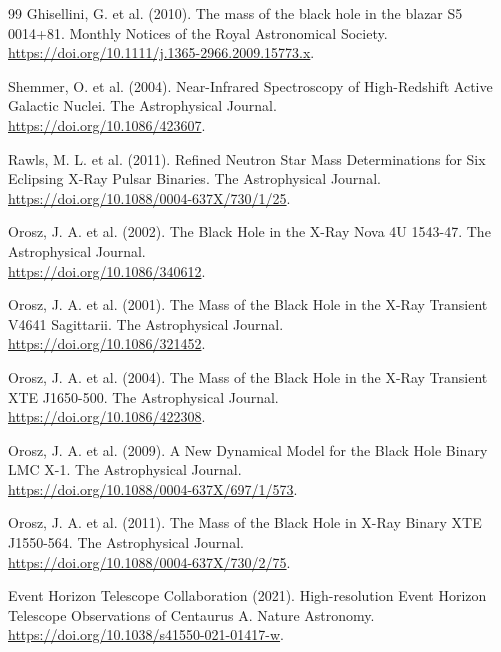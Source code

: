 \documentclass[11pt, a4paper]{article}
\begin{document}
\begin{thebibliography}{99}
  Ghisellini, G. et al. (2010). The mass of the black hole in the blazar S5 0014+81. Monthly Notices of the Royal Astronomical Society. \\ \url{https://doi.org/10.1111/j.1365-2966.2009.15773.x}.

  Shemmer, O. et al. (2004). Near-Infrared Spectroscopy of High-Redshift Active Galactic Nuclei. The Astrophysical Journal. \\ \url{https://doi.org/10.1086/423607}.

  Rawls, M. L. et al. (2011). Refined Neutron Star Mass Determinations for Six Eclipsing X-Ray Pulsar Binaries. The Astrophysical Journal. \\ \url{https://doi.org/10.1088/0004-637X/730/1/25}.
  
  Orosz, J. A. et al. (2002). The Black Hole in the X-Ray Nova 4U 1543-47. The Astrophysical Journal. \\ \url{https://doi.org/10.1086/340612}.

  Orosz, J. A. et al. (2001). The Mass of the Black Hole in the X-Ray Transient V4641 Sagittarii. The Astrophysical Journal. \\ \url{https://doi.org/10.1086/321452}.

  Orosz, J. A. et al. (2004). The Mass of the Black Hole in the X-Ray Transient XTE J1650-500. The Astrophysical Journal. \\ \url{https://doi.org/10.1086/422308}.

  Orosz, J. A. et al. (2009). A New Dynamical Model for the Black Hole Binary LMC X-1. The Astrophysical Journal. \\ \url{https://doi.org/10.1088/0004-637X/697/1/573}.

  Orosz, J. A. et al. (2011). The Mass of the Black Hole in X-Ray Binary XTE J1550-564. The Astrophysical Journal. \\ \url{https://doi.org/10.1088/0004-637X/730/2/75}.

  Event Horizon Telescope Collaboration (2021). High-resolution Event Horizon Telescope Observations of Centaurus A. Nature Astronomy. \\ \url{https://doi.org/10.1038/s41550-021-01417-w}.


\end{thebibliography}
\end{document}
